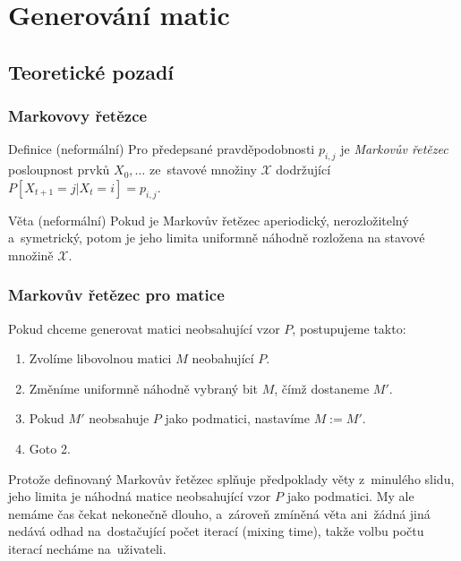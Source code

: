 \documentclass{beamer}
\begin{document}

\section{Generování matic}
\subsection{Teoretické pozadí}
\begin{frame}
\frametitle{Markovovy řetězce}
\begin{block}{Definice (neformální)}
Pro předepsané pravděpodobnosti $p_{i,j}$ je \emph{Markovův řetězec} posloupnost prvků $X_0,\dots$ ze~stavové množiny $\mathcal{X}$ dodržující $P[X_{t+1}=j|X_t=i]=p_{i,j}.$
\end{block}
\pause
\begin{block}{Věta (neformální)}
Pokud je Markovův řetězec aperiodický, nerozložitelný a~symetrický, potom je jeho limita uniformně náhodně rozložena na stavové množině $\mathcal{X}$.
\end{block}
\end{frame}

\begin{frame}
\frametitle{Markovův řetězec pro matice}
Pokud chceme generovat matici neobsahující vzor $P$, postupujeme takto:
\begin{enumerate}
\item Zvolíme libovolnou matici $M$ neobahující $P$.
\item Změníme uniformně náhodně vybraný bit $M$, čímž dostaneme $M'$.
\item Pokud $M'$ neobsahuje $P$ jako podmatici, nastavíme $M:=M'$.
\item Goto 2.
\end{enumerate}
\vspace{1em}
\pause
Protože definovaný Markovův řetězec splňuje předpoklady věty z~minulého slidu, jeho limita je náhodná matice neobsahující vzor $P$ jako podmatici. My ale nemáme čas čekat nekonečně dlouho, a~zároveň zmíněná věta ani~žádná jiná nedává odhad na~dostačující počet iterací (mixing time), takže volbu počtu iterací necháme na~uživateli.
\end{frame}
\end{document}
